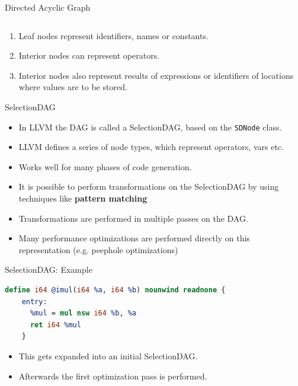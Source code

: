 \documentclass[]{beamer}
\begin{document}
\begin{frame}{Directed Acyclic Graph}
\begin{columns}[b]
\begin{column}{.5\textwidth}
\begin{center}
      \end{center}
    \end{column}
  \end{columns}
  \begin{enumerate}
    \item Leaf nodes represent identifiers, names or constants.
    \item Interior nodes can represent operators.
    \item Interior nodes also represent results of expressions or identifiers of locations where values are to be stored.
  \end{enumerate}
\end{frame}

\begin{frame}{SelectionDAG}
  \begin{itemize}
    \item In LLVM the DAG is called a SelectionDAG, based on the \lstinline[language=c++]{SDNode} class.
    \item LLVM defines a series of node types, which represent operators, vars etc.
    \item Works well for many phases of code generation.
    \item It is possible to perform transformations on the SelectionDAG by using techniques like \textbf{pattern matching} 
    \item Transformations are performed in multiple passes on the DAG.
    \item Many performance optimizations are performed directly on this representation (e.g. peephole optimizations)
  \end{itemize}
\end{frame}

\begin{frame}[fragile]{SelectionDAG: Example}
  \begin{lstlisting}[language=LLVM,gobble=4]
    define i64 @imul(i64 %a, i64 %b) nounwind readnone {
    entry:
      %mul = mul nsw i64 %b, %a
      ret i64 %mul
    }
  \end{lstlisting}

  \begin{itemize}
    \item This gets expanded into an initial SelectionDAG.
    \item Afterwards the first optimization pass is performed.
  \end{itemize}
\end{frame}
\end{document}

